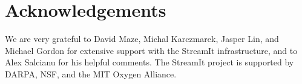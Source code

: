 \section{Acknowledgements}

We are very grateful to David Maze, Michal Karczmarek, Jasper Lin, and
Michael Gordon for extensive support with the StreamIt infrastructure,
and to Alex Salcianu for his helpful comments.  The StreamIt project
is supported by DARPA, NSF, and the MIT Oxygen Alliance.
